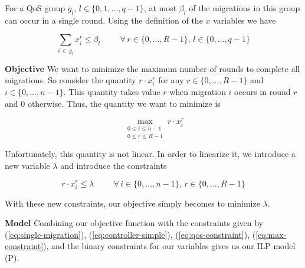 \documentclass[conference]{IEEEtran}
\begin{document}
\noindent For a QoS group $g_{l}$, $l \in \{0, 1, ..., q-1\}$, at most $\beta_{l}$ of the migrations in this group can occur in a single round. Using the definition of the $x$ variables we have

\begin{equation}\label{eq:qos-constraint}
    \sum_{i \, \in \, g_{l}} x^{r}_{i} \leq \beta_{l} \hspace{1cm} \forall \, r \in \{0, ..., R - 1\}, \, l \in \{0, ..., q-1\}
\end{equation}

\noindent\textbf{Objective}
We want to minimize the maximum number of rounds to complete all migrations. So consider the quantity $r \cdot x^{r}_{i}$ for any $r \in \{0, ..., R - 1\}$ and $i \in \{0, ..., n - 1\}$. This quantity takes value $r$ when migration $i$ occurs in round $r$ and 0 otherwise. Thus, the quantity we want to minimize is

$$\max_{\substack{0 \leq i \leq n - 1 \\ 0 \leq r \leq R - 1}} r  \cdot x^{r}_{i}$$

Unfortunately, this quantity is not linear. In order to linearize it, we introduce a new variable $\lambda$ and introduce the constraints

\begin{equation}\label{eq:max-constraint}
    r \cdot x^{r}_{i} \leq \lambda \hspace{1cm} \forall \, i \in \{0, ..., n-1\}, \, r \in \{0, ..., R - 1\}
\end{equation}

With these new constraints, our objective simply becomes to minimize $\lambda$.

\noindent\textbf{Model}
\noindent Combining our objective function with the constraints given by (\ref{eq:single-migration}), (\ref{eq:controller-simple}), (\ref{eq:qos-constraint}), (\ref{eq:max-constraint}), and the binary constraints for our variables gives us our ILP model (P).\newline
\end{document}

